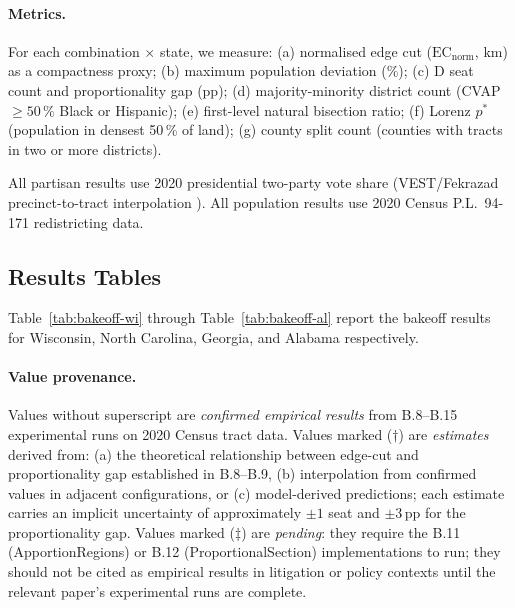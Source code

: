\paragraph{Metrics.}
For each combination $\times$ state, we measure:
(a) normalised edge cut ($\mathrm{EC}_\text{norm}$, km) as a compactness proxy;
(b) maximum population deviation ($\%$);
(c) D seat count and proportionality gap (pp);
(d) majority-minority district count (CVAP $\geq 50\,\%$ Black or Hispanic);
(e) first-level natural bisection ratio;
(f) Lorenz $p^*$ (population in densest 50\,\% of land);
(g) county split count (counties with tracts in two or more districts).

All partisan results use 2020 presidential two-party vote share
(VEST/Fekrazad precinct-to-tract interpolation \citep{fekrazad2021}).
All population results use 2020 Census P.L.\ 94-171 redistricting data.

\subsection{Results Tables}

Table~\ref{tab:bakeoff-wi} through Table~\ref{tab:bakeoff-al} report the
bakeoff results for Wisconsin, North Carolina, Georgia, and Alabama respectively.

\paragraph{Value provenance.}
Values without superscript are \emph{confirmed empirical results} from B.8--B.15
experimental runs on 2020 Census tract data.
Values marked \est{} ($\dagger$) are \emph{estimates} derived from:
(a) the theoretical relationship between edge-cut and proportionality gap established
in B.8--B.9, (b) interpolation from confirmed values in adjacent configurations,
or (c) model-derived predictions; each estimate carries an implicit uncertainty of
approximately $\pm 1$ seat and $\pm 3$\,pp for the proportionality gap.
Values marked \pendinging{} ($\ddagger$) are \emph{pending}: they require the B.11
(ApportionRegions) or B.12 (ProportionalSection) implementations to run; they should
not be cited as empirical results in litigation or policy contexts until the relevant
paper's experimental runs are complete.

